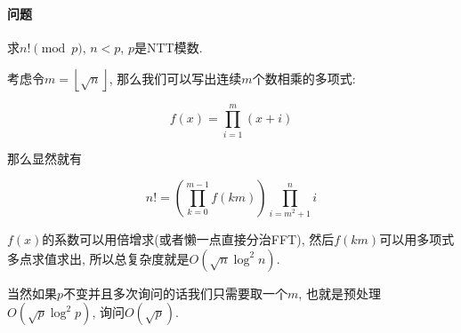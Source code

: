 \paragraph{问题} 求$n! \pmod p$, $n < p$, $p$是NTT模数.

考虑令$m = \left\lfloor \sqrt n \right\rfloor$, 那么我们可以写出连续$m$个数相乘的多项式:

$$ f(x) = \prod_{i = 1} ^ m (x + i) $$

那么显然就有

$$ n! = \left( \prod_{k = 0} ^ {m - 1} f(k m) \right) \prod_{i = m ^ 2 + 1} ^ n i $$

$f(x)$的系数可以用倍增求(或者懒一点直接分治FFT), 然后$f(km)$可以用多项式多点求值求出, 所以总复杂度就是$O(\sqrt n \log^2 n)$.

当然如果$p$不变并且多次询问的话我们只需要取一个$m$, 也就是预处理$O(\sqrt p \log^2 p)$, 询问$O(\sqrt p)$.
